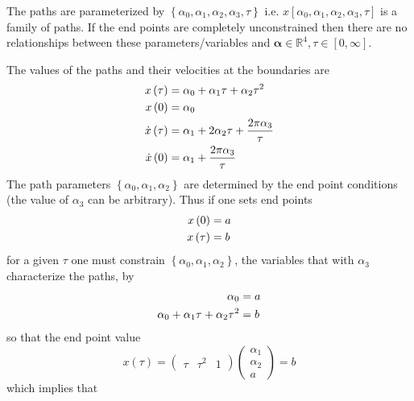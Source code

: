 \documentclass[aps,preprint]{revtex4}
\begin{document}
The paths are parameterized by $\left\{ \alpha _{0},\alpha _{1},\alpha
_{2},\alpha _{3},\tau \right\} $ i.e. $x\left[ \alpha _{0},\alpha
_{1},\alpha _{2},\alpha _{3},\tau \right] $ is a family of paths. If the end
points are completely unconstrained then there are no relationships between
these parameters/variables and $\mathbf{\alpha \in }\mathbb{R}^{4},\tau \in %
\left[ 0,\infty \right] $.

The values of the paths and their velocities at the boundaries are
\begin{align}
x\left( \tau \right) & =\alpha _{0}+\alpha _{1}\tau +\alpha _{2}\tau ^{2}
\notag \\
x\left( 0\right) & =\alpha _{0}  \notag \\
\dot{x}\left( \tau \right) & =\alpha _{1}+2\alpha _{2}\tau +\frac{2\pi
\alpha _{3}}{\tau }  \notag \\
\dot{x}\left( 0\right) & =\alpha _{1}+\frac{2\pi \alpha _{3}}{\tau }
\end{align}%
The path parameters $\left\{ \alpha _{0},\alpha _{1},\alpha _{2}\right\} $
are determined by the end point conditions (the value of $\alpha _{3}$ can
be arbitrary). Thus if one sets end points
\begin{align}
x\left( 0\right) & =a  \notag \\
x\left( \tau \right) & =b
\end{align}%
for a given $\tau $ one must constrain $\left\{ \alpha _{0},\alpha
_{1},\alpha _{2}\right\} $, the variables that with $\alpha _{3}$
characterize the paths, by
\begin{align}
\alpha _{0}& =a  \notag \\
\alpha _{0}+\alpha _{1}\tau +\alpha _{2}\tau ^{2}& =b
\end{align}%
so that the end point value
\begin{equation}
x\left( \tau \right) =\left(
\begin{array}{ccc}
\tau & \tau ^{2} & 1%
\end{array}%
\right) \left(
\begin{array}{c}
\alpha _{1} \\
\alpha _{2} \\
a%
\end{array}%
\right) =b
\end{equation}%
which implies that
\end{document}
